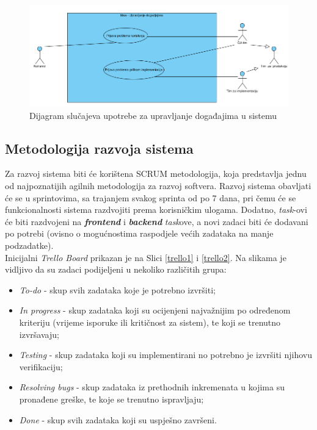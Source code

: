 \documentclass[12pt,a4paper]{article}
\begin{document}
\begin{figure}[H]
\center
\includegraphics[scale=0.45]{../res/useCase2.PNG}
\caption{Dijagram slučajeva upotrebe za upravljanje događajima u sistemu}
\label{useCase2}
\end{figure}

\newpage

\subsection{Metodologija razvoja sistema}

\quad Za razvoj sistema biti će korištena SCRUM metodologija, koja predstavlja jednu od najpoznatijih agilnih metodologija za razvoj softvera. Razvoj sistema obavljati će se u sprintovima, sa trajanjem svakog sprinta od po 7 dana, pri čemu će se funkcionalnosti sistema razdvojiti prema korisničkim ulogama. Dodatno, \textit{task}-ovi će biti razdvojeni na \textbf{\textit{frontend}} i \textbf{\textit{backend}} \textit{task}ove, a novi zadaci biti će dodavani po potrebi (ovisno o mogućnostima raspodjele većih zadataka na manje podzadatke). \\

Inicijalni \textit{Trello Board} prikazan je na Slici \ref{trello1} i \ref{trello2}. Na slikama je vidljivo da su zadaci podijeljeni u nekoliko različitih grupa:

\begin{itemize}
\renewcommand\labelitemi{-}
\item \textit{To-do} - skup svih zadataka koje je potrebno izvršiti;
\item \textit{In progress} - skup zadataka koji su ocijenjeni najvažnijim po određenom kriteriju (vrijeme isporuke ili kritičnost za sistem), te koji se trenutno izvršavaju;
\item \textit{Testing} - skup zadataka koji su implementirani no potrebno je izvršiti njihovu verifikaciju;
\item \textit{Resolving bugs} - skup zadataka iz prethodnih inkremenata u kojima su pronađene greške, te koje se trenutno ispravljaju;
\item \textit{Done} - skup svih zadataka koji su uspješno završeni.
\end{itemize}
\end{document}
